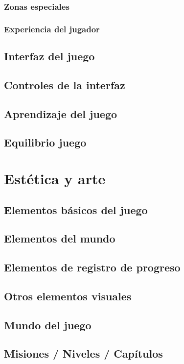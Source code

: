 \subsubsection{Zonas especiales}
\subsubsection{Experiencia del jugador}
\subsection{Interfaz del juego}
\subsection{Controles de la interfaz}
\subsection{Aprendizaje del juego}
\subsection{Equilibrio juego}



\section{Estética y arte}
\subsection{Elementos básicos del juego}
\subsection{Elementos del mundo}
\subsection{Elementos de registro de progreso}
\subsection{Otros elementos visuales}
\subsection{Mundo del juego}
\subsection{Misiones / Niveles / Capítulos}
